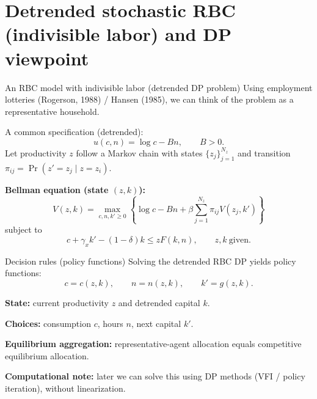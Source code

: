 \documentclass[aspectratio=169,xcolor=dvipsnames]{beamer}
\let\tempone\itemize
\let\temptwo\enditemize
\renewenvironment{itemize}{\tempone\addtolength{\itemsep}{\fill}}{\temptwo}
\begin{document}
\section[Detrend]{Detrended stochastic RBC (indivisible labor) and DP viewpoint}

\begin{frame}{An RBC model with indivisible labor (detrended DP problem)}
\label{slide:BC_IndivisibleDP}
\small
Using employment lotteries (Rogerson, 1988) / Hansen (1985), we can think of the problem as a representative household.

\vspace{0.4em}
A common specification (detrended):
\[
 u(c,n)=\log c - B n,
\qquad B>0.
\]
Let productivity \(z\) follow a Markov chain with states \(\{z_j\}_{j=1}^{N_z}\) and transition \(\pi_{ij}=\Pr(z'=z_j\mid z=z_i)\).

\vspace{0.4em}
\textbf{Bellman equation (state \((z,k)\)):}
\[
V(z,k)=\max_{c,n,k'\ge 0}\left\{\log c -Bn + \beta\sum_{j=1}^{N_z}\pi_{ij}V(z_j,k')\right\}
\]
subject to
\[
 c + \gamma_x k' - (1-\delta)k \le z F(k,n),
\qquad z,k\ \text{given.}
\]
\end{frame}

\begin{frame}{Decision rules (policy functions)}
\label{slide:BC_PolicyRules}
\small
Solving the detrended RBC DP yields policy functions:
\[
 c = c(z,k),\qquad n=n(z,k),\qquad k' = g(z,k).
\]
\begin{itemize}
    \item \textbf{State:} current productivity \(z\) and detrended capital \(k\).
    \item \textbf{Choices:} consumption \(c\), hours \(n\), next capital \(k'\).
    \item \textbf{Equilibrium aggregation:} representative-agent allocation equals competitive equilibrium allocation.
\end{itemize}

\vspace{0.4em}
\textbf{Computational note:} later we can solve this using DP methods (VFI / policy iteration), without linearization.
\end{frame}

\end{document}
